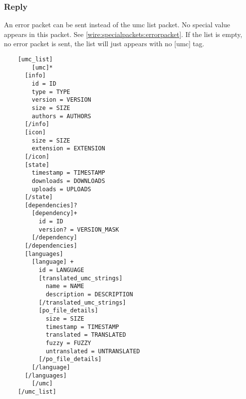 \subsubsection{Reply}

An error packet can be sent instead of the umc list packet. No special value appears in this packet. See \cref{wire:specialpackets:errorpacket}.
If the list is empty, no error packet is sent, the list will just appears with no [umc] tag.

\begin{lstlisting}
	[umc_list]
		[umc]*
      [info]
        id = ID
        type = TYPE
        version = VERSION
        size = SIZE
        authors = AUTHORS
      [/info]
      [icon]
        size = SIZE
        extension = EXTENSION
      [/icon]
      [state]
        timestamp = TIMESTAMP
        downloads = DOWNLOADS
        uploads = UPLOADS
      [/state]
      [dependencies]?
        [dependency]+
          id = ID
          version? = VERSION_MASK
        [/dependency]
      [/dependencies]
      [languages]
        [language] +
          id = LANGUAGE
          [translated_umc_strings]
            name = NAME
            description = DESCRIPTION
          [/translated_umc_strings]
          [po_file_details]
            size = SIZE
            timestamp = TIMESTAMP
            translated = TRANSLATED
            fuzzy = FUZZY
            untranslated = UNTRANSLATED
          [/po_file_details]
        [/language]
      [/languages]
		[/umc]
	[/umc_list]
\end{lstlisting}

